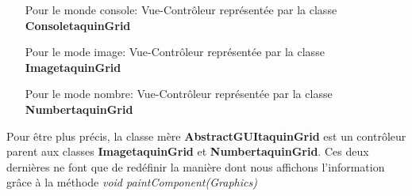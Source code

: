 	\begin{itemize}
		\item [Pour le monde console:] Vue-Contrôleur représentée par la classe \textbf{ConsoletaquinGrid}
		\item [Pour le mode image:]  Vue-Contrôleur représentée par la classe \textbf{ImagetaquinGrid}
		\item [Pour le mode nombre:]  Vue-Contrôleur représentée par la classe \textbf{NumbertaquinGrid}
	\end{itemize}

	Pour être plus précis, la classe mère \textbf{AbstractGUItaquinGrid} est un contrôleur parent aux classes \textbf{ImagetaquinGrid} et \textbf{NumbertaquinGrid}. Ces deux dernières ne font que de redéfinir la manière dont nous affichons l'information grâce à la méthode \textit{void paintComponent(Graphics)}
